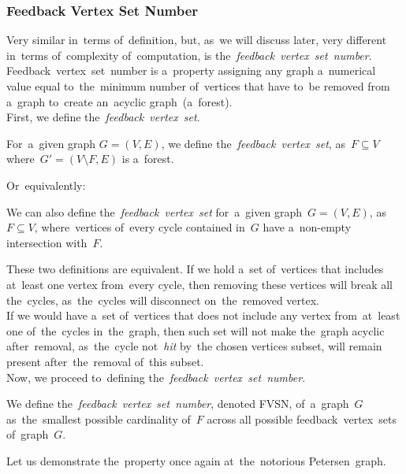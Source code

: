 \subsubsection{Feedback Vertex Set Number}
\label{subsubsec:FeedbackVertexSetNumber}
Very similar in~terms of~definition, but, as~we will discuss later, very different in~terms of~complexity of~computation, is the~\textit{feedback~vertex~set~number}.
Feedback~vertex~set~number is a~property assigning any graph a~numerical value equal to~the~minimum number of~vertices that have to~be removed from a~graph to~create an~acyclic graph~(a~forest). \\
First, we define the~\textit{feedback~vertex~set}.
\begin{definition}
    For~a~given graph $G = (V, E)$, we define the~\emph{feedback~vertex~set}, as~$F \subseteq V$ where~$G' = (V \setminus F, E)$ is a~forest.
\end{definition}
Or~equivalently:
\begin{definition}
    We can also define the~\emph{feedback~vertex~set} for~a~given graph~$G = (V, E)$, as~$F \subseteq V$, where~vertices of~every cycle contained in~$G$ have a~non-empty intersection with~$F$.
\end{definition}
These two definitions are equivalent. If we hold a~set of~vertices that includes at~least one vertex from~every cycle, then removing these vertices will break all the~cycles, as~the~cycles will disconnect on~the~removed vertex. \\
If we would have a~set of~vertices that does not include any vertex from~at~least one of~the~cycles in~the~graph, then such set will not make the~graph acyclic after~removal, as~the~cycle not~\textit{hit} by~the chosen vertices subset, will remain present after~the~removal of~this subset.\\
Now, we proceed to~defining the~\textit{feedback~vertex~set~number}.
\begin{definition}
    We define the~\emph{feedback~vertex~set~number}, denoted FVSN, of~a~graph~$G$ as~the~smallest possible cardinality of~$F$ across all possible feedback~vertex~sets of~graph~$G$.
\end{definition}
Let us demonstrate the~property once again at~the~notorious Petersen~graph.
